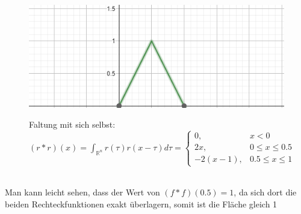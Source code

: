 \documentclass[12pt,a4paper]{article}
\newcommand{\nl}{\\[0.1cm]}
\begin{document}
\begin{minipage}{\linewidth}
\centering
\begin{minipage}{0.45\linewidth}
\begin{figure}[H]
\includegraphics[width=\linewidth]{./resources/rechteck_faltung.png}
\end{figure}
\end{minipage}
\hspace{0.05\linewidth}
\begin{minipage}{0.45\linewidth}
\begin{figure}[H]
Faltung mit sich selbst: $(r\ast r)(x) = \displaystyle \int_{\mathbb{R}^n} r(\tau)r(x-\tau)d\tau = \begin{cases} 0,& x<0 \\ 2x, & 0 \leq x \leq 0.5 \\ -2(x-1), & 0.5 \leq x \leq 1 \end{cases}$
\end{figure}
\end{minipage}
\end{minipage}
\nl
Man kann leicht sehen, dass der Wert von $(f \ast f) (0.5) = 1$, da sich dort die beiden Rechteckfunktionen exakt überlagern, somit ist die Fläche gleich 1
\end{document}
